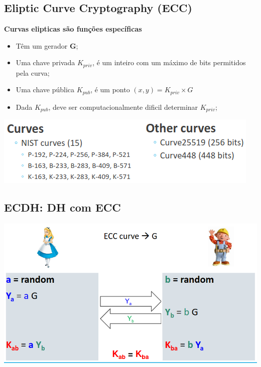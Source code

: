\documentclass{article}
\begin{document}
\pagebreak

\subsection{Eliptic Curve Cryptography (ECC)}

\begin{flushleft}
  \textbf{Curvas elipticas são funções específicas}
  \begin{itemize}
    \item Têm um gerador \textbf{G};
    \item Uma chave privada $K_{priv}$, é um inteiro com um máximo de
    bits permitidos pela curva;
    \item Uma chave pública $K_{pub}$, é um ponto $(x, y) = K_{priv} \times G$
    \item Dada $K_{pub}$, deve ser computacionalmente dificil determinar $K_{priv}$;
  \end{itemize}

  \begin{center}
    \includegraphics[scale=0.5]{9}
  \end{center}
\end{flushleft}

\subsection{ECDH: DH com ECC}

\begin{center}
  \includegraphics[scale=0.4]{8}
\end{center}
\end{document}
